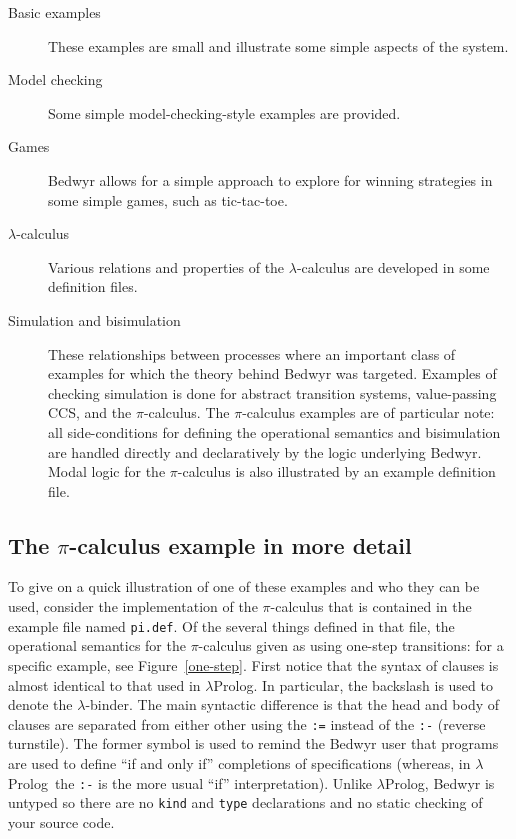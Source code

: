 \documentclass{article}
\newcommand{\lp}{$\lambda$Prolog}
\begin{document}
\begin{description}
\item[Basic examples] These examples are small and illustrate some
  simple aspects of the system.

\item[Model checking] Some simple model-checking-style examples are
  provided. 

\item[Games] Bedwyr allows for a simple approach to explore for
  winning strategies in some simple games, such as tic-tac-toe.

\item[$\lambda$-calculus] Various relations and properties of the
  $\lambda$-calculus are developed in some definition files.

\item[Simulation and bisimulation] These relationships between
  processes where an important class of examples for which the theory
  behind Bedwyr was targeted.  Examples of checking simulation is done
  for abstract transition systems, value-passing CCS, and the
  $\pi$-calculus.  The $\pi$-calculus examples are of particular note:
  all side-conditions for defining the operational semantics and
  bisimulation are handled directly and declaratively by the logic
  underlying Bedwyr.   Modal logic for the $\pi$-calculus is also
  illustrated by an example definition file.

\end{description}

\subsection{The $\pi$-calculus example in more detail}

To give on a quick illustration of one of these examples and who they
can be used, consider the implementation of the $\pi$-calculus that is
contained in the example file named \verb+pi.def+.  Of the several
things defined in that file, the operational semantics for the
$\pi$-calculus given as using one-step transitions: for a specific
example, see Figure~\ref{one-step}.  First notice that the syntax of
clauses is almost identical to that used in $\lambda$Prolog.  In
particular, the backslash is used to denote the $\lambda$-binder.  The
main syntactic difference is that the head and body of clauses are
separated from either other using the \verb+:=+ instead of the
\verb+:-+ (reverse turnstile).  The former symbol is used to remind
the Bedwyr user that programs are used to define ``if and only if''
completions of specifications (whereas, in \lp\ the \verb+:-+ is the
more usual ``if'' interpretation).  Unlike \lp, Bedwyr is
untyped so there are no {\tt kind} and {\tt type} declarations and no
static checking of your source code.  
\end{document}
